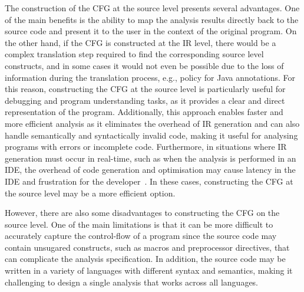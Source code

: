 The construction of the CFG at the source level presents several advantages. One of the
main benefits is the ability to map the analysis results directly back to the source code
and present it to the user in the context of the original program. On the other hand,
if the CFG is constructed at the IR level, there would be a complex translation step
required to find the corresponding source level constructs, and in some cases it would
not even be possible due to the loss of information during the translation process, e.g.,
 policy for Java annotations.
For this reason, constructing the CFG at the source level is particularly useful for
debugging and program understanding tasks, as it provides a clear and direct
representation of the program. Additionally, this approach enables faster and
more efficient analysis as it eliminates the overhead of IR generation and can
also handle semantically and syntactically invalid code, making it useful for
analysing programs with errors or incomplete code. Furthermore, in situations where
IR generation must occur in real-time, such as when the analysis is performed in an
IDE, the overhead of code generation and optimisation may cause latency in the IDE and frustration for the developer~\cite{piskachev2022far}.
In these cases, constructing the CFG at the source level may be a more efficient option.

However, there are also some disadvantages to constructing the CFG on the source level.
One of the main limitations is that it can be more difficult to accurately capture the
control-flow of a program since the source code may contain unsugared constructs,
such as macros and preprocessor directives, that
can complicate the analysis specification. In addition, the source code may be written in a variety
of languages with different syntax and semantics, making it challenging to
design a single analysis that works across all languages.

